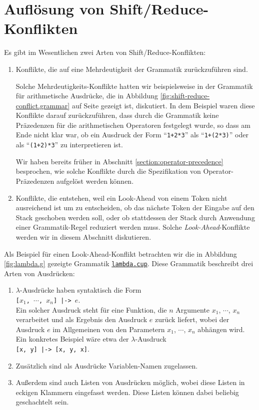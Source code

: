 \section{Aufl\"osung von Shift/Reduce-Konflikten}
Es gibt im Wesentlichen zwei Arten von Shift/Reduce-Konflikten:
\begin{enumerate}
\item Konflikte, die auf eine Mehrdeutigkeit der Grammatik zur\"uckzuf\"uhren sind.

      Solche Mehrdeutigkeits-Konflikte hatten wir beispielsweise in der Grammatik f\"ur arithmetische
      Ausdr\"ucke, die in Abbildung \ref{fig:shift-reduce-conflict.grammar} auf Seite
      \pageref{fig:shift-reduce-conflict.grammar} gezeigt ist, diskutiert.  In dem Beispiel waren
      diese Konflikte darauf zur\"uckzuf\"uhren, dass durch die Grammatik keine Pr\"azedenzen f\"ur die
      arithmetischen Operatoren festgelegt wurde, so dass am Ende nicht klar war, ob ein Ausdruck
      der Form ``\texttt{1+2*3}'' als ``\texttt{1+(2*3)}'' oder als ``\texttt{(1+2)*3}'' zu
      interpretieren ist.

      Wir haben bereits fr\"uher in Abschnitt \ref{section:operator-precedence} besprochen, wie solche
      Konflikte durch die Spezifikation von Operator-Pr\"azedenzen aufgel\"ost werden k\"onnen.
\item Konflikte, die entstehen, weil ein Look-Ahead von einem Token nicht ausreichend ist um zu
      entscheiden, ob das n\"achste Token der Eingabe auf den Stack geschoben werden soll, oder 
      ob stattdessen der Stack durch Anwendung einer Grammatik-Regel reduziert werden muss.
      Solche \emph{Look-Ahead}-Konflikte   werden wir in diesem Abschnitt diskutieren.
\end{enumerate}
Als Beispiel f\"ur einen Look-Ahead-Konflikt betrachten wir die in Abbildung \ref{fig:lambda.g}
gezeigte Grammatik
\href{https://github.com/karlstroetmann/Formal-Languages/tree/master/Cup/LambdaExpr/lambda.cup}{\texttt{lambda.cup}}.  
Diese Grammatik beschreibt drei Arten von Ausdr\"ucken:
\begin{enumerate}
\item $\lambda$-Ausdr\"ucke haben syntaktisch die Form
      \\[0.2cm]
      \hspace*{1.3cm}
      \texttt{[$x_1$, $\cdots$, $x_n$] |-> $e$}.
      \\[0.2cm]
      Ein solcher Ausdruck steht f\"ur eine Funktion, die $n$ Argumente $x_1$, $\cdots$, $x_n$
      verarbeitet und als Ergebnis den Ausdruck $e$ zur\"uck liefert, wobei der Ausdruck $e$ im
      Allgemeinen von den Parametern $x_1$, $\cdots$, $x_n$ abh\"angen wird.   Ein konkretes Beispiel
      w\"are etwa der $\lambda$-Ausdruck
      \\[0.2cm]
      \hspace*{1.3cm}
      \texttt{[x, y] |-> [x, y, x]}.
\item Zus\"atzlich sind als Ausdr\"ucke Variablen-Namen zugelassen.
\item Au{\ss}erdem sind auch Listen von Ausdr\"ucken m\"oglich, wobei diese Listen in eckigen Klammern
      eingefasst werden.  Diese Listen k\"onnen dabei beliebig geschachtelt sein.
\end{enumerate}

